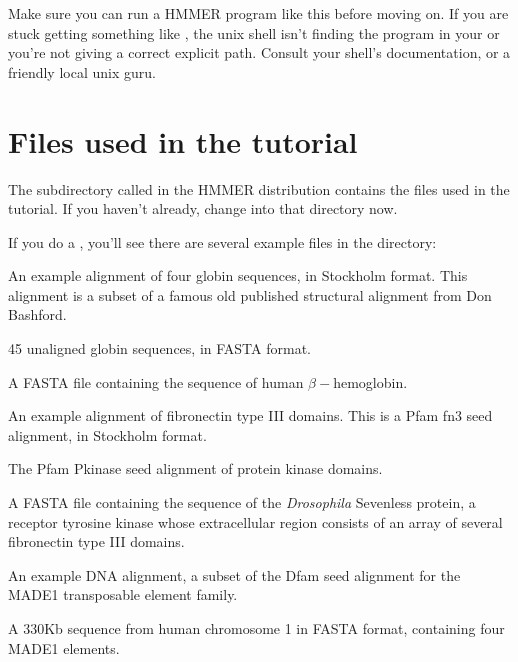 Make sure you can run a HMMER program like this before moving on.  If
you are stuck getting something like , the unix shell isn't finding the program in your 
or you're not giving a correct explicit path. Consult your shell's
documentation, or a friendly local unix guru.

\section{Files used in the tutorial}

The subdirectory called  in the HMMER distribution
contains the files used in the tutorial. If you haven't already,
change into that directory now. 

  \vspace{1ex}
  \vspace{1ex}

If you do a , you'll see there are several example files in
the  directory:

\begin{sreitems}{}
\item[\monob{globins4.sto}] An example alignment of four globin sequences, in
  Stockholm format. This alignment is a subset of a famous old
  published structural alignment from Don Bashford.\cite{Bashford87}
%
\item[\monob{globins45.fa}] 45 unaligned globin sequences, in FASTA
  format.
%
\item[\monob{HBB\_HUMAN}] A FASTA file containing the sequence of
  human $\beta-$hemoglobin.
%
\item[\monob{fn3.sto}] An example alignment of fibronectin type III
  domains. This is a Pfam fn3 seed alignment, in Stockholm format.
%
\item[\monob{Pkinase.sto}] The Pfam Pkinase seed alignment of protein
  kinase domains.
%
\item[\monob{7LESS\_DROME}] A FASTA file containing the sequence of
  the \emph{Drosophila} Sevenless protein, a receptor tyrosine kinase
  whose extracellular region consists of an array of several
  fibronectin type III domains.
%
\item[\monob{MADE1.sto}] An example DNA alignment, a subset
of the Dfam seed alignment for the MADE1 transposable element family. 
%
\item[\monob{dna\_target.fa}] A 330Kb sequence from human chromosome
  1 in FASTA format, containing four MADE1 elements.
\end{sreitems}


